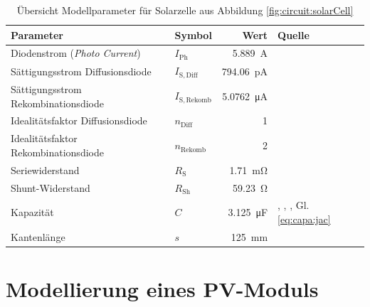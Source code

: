 \begin{table}[h!t]
    \centering
    \caption{\"Ubersicht Modellparameter f\"ur Solarzelle aus Abbildung \ref{fig:circuit:solarCell}}
    \label{tab:solarCell:params}
    \begin{tabular}{llrp{20mm}}
        \toprule
        Parameter                              & Symbol                  & Wert                       & Quelle                 \\
        \midrule
        Diodenstrom (\emph{Photo Current})     & $I_{\mathrm{Ph}}$       & \SI{5.889}{\ampere}        & \cite{pvcell:masmoudi} \\
        S\"attigungsstrom Diffusionsdiode      & $I_{\mathrm{S,Diff}}$   & \SI{794.06}{\pico\ampere}  & \cite{pvcell:masmoudi} \\
        S\"attigungsstrom Rekombinationsdiode  & $I_{\mathrm{S,Rekomb}}$ & \SI{5.0762}{\micro\ampere} & \cite{pvcell:masmoudi} \\
        Idealit\"atsfaktor Diffusionsdiode     & $n_{\mathrm{Diff}}$     & \num{1}                    & \cite{pvcell:masmoudi} \\
        Idealit\"atsfaktor Rekombinationsdiode & $n_{\mathrm{Rekomb}}$   & \num{2}                    & \cite{pvcell:masmoudi} \\
        Seriewiderstand                        & $R_{\mathrm{S}}$        & \SI{1.71}{\milli\ohm}      & \cite{pvcell:masmoudi} \\
        Shunt-Widerstand                       & $R_{\mathrm{Sh}}$       & \SI{59.23}{\ohm}           & \cite{pvcell:masmoudi} \\
        Kapazit\"at                            & $C$                     & \SI{3.125}{\micro\farad}   & \cite{capacitance:hegedus}, \cite{capacitance:mandal}, \cite{capacitance:mauk}, Gl. \ref{eq:capa:jac} \\
        Kantenl\"ange                          & $s$                     & \SI{125}{\milli\meter}     & \cite{pvcell:masmoudi} \\
        \bottomrule
    \end{tabular}
\end{table}

\clearpage
\section{Modellierung eines PV-Moduls}
\label{sec:simu:model:module}


